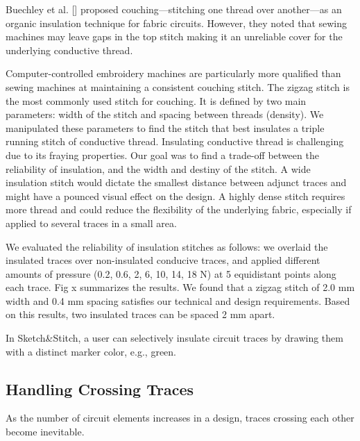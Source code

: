 \documentclass[header.tex]{subfiles}
\begin{document}

Buechley et al. [] proposed couching---stitching one thread over another---as an organic insulation technique for fabric circuits. However, they noted that sewing machines may leave gaps in the top stitch making it an unreliable cover for the underlying conductive thread.

Computer-controlled embroidery machines are particularly more qualified than sewing machines at maintaining a consistent couching stitch. The zigzag stitch is the most commonly used stitch for couching. It is defined by two main parameters: width of the stitch and spacing between threads (density). We manipulated these parameters to find the stitch that best insulates a triple running stitch of conductive thread. Insulating conductive thread is challenging due to its fraying properties. Our goal was to find a trade-off between the reliability of insulation, and the width and destiny of the stitch. A wide insulation stitch would dictate the smallest distance between adjunct traces and might have a pounced visual effect on the design. A highly dense stitch requires more thread and could reduce the flexibility of the underlying fabric, especially if applied to several traces in a small area.

We evaluated the reliability of insulation stitches as follows: we overlaid the insulated traces over non-insulated conducive traces, and applied different amounts of pressure (0.2, 0.6, 2, 6, 10, 14, 18 N) at 5 equidistant points along each trace. Fig x summarizes the results. We found that a zigzag stitch of 2.0 mm width and 0.4 mm spacing satisfies our technical and design requirements. Based on this results, two insulated traces can be spaced 2 mm apart.

In Sketch\&Stitch, a user can selectively insulate circuit traces by drawing them with a distinct marker color, e.g., green.



\subsection{Handling Crossing Traces}
As the number of circuit elements increases in a design, traces crossing each other become inevitable. 
\end{document}
